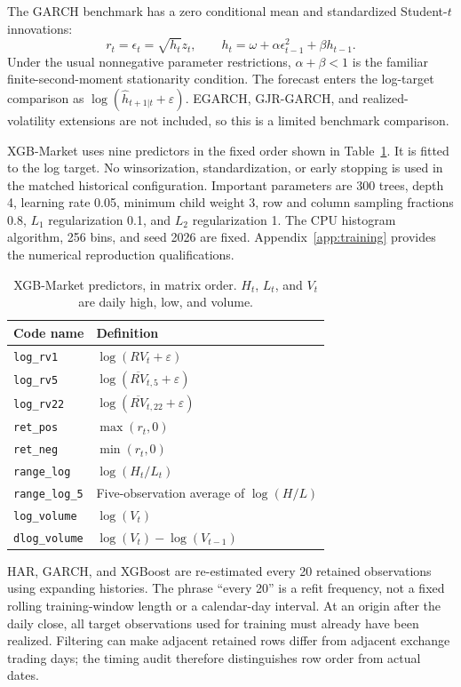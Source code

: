 The GARCH benchmark has a zero conditional mean and standardized Student-$t$ innovations:
\begin{equation}
r_t=\epsilon_t=\sqrt{h_t}z_t,\qquad
h_t=\omega+\alpha\epsilon_{t-1}^2+\beta h_{t-1}.
\end{equation}
Under the usual nonnegative parameter restrictions, $\alpha+\beta<1$ is the familiar finite-second-moment stationarity condition. The forecast enters the log-target comparison as $\log(\widehat h_{t+1|t}+\varepsilon)$. EGARCH, GJR-GARCH, and realized-volatility extensions are not included, so this is a limited benchmark comparison.

XGB-Market uses nine predictors in the fixed order shown in Table~\ref{tab:variables_main}. It is fitted to the log target. No winsorization, standardization, or early stopping is used in the matched historical configuration. Important parameters are 300 trees, depth 4, learning rate 0.05, minimum child weight 3, row and column sampling fractions 0.8, $L_1$ regularization 0.1, and $L_2$ regularization 1. The CPU histogram algorithm, 256 bins, and seed 2026 are fixed. Appendix~\ref{app:training} provides the numerical reproduction qualifications.

\begin{table}[htbp]\centering\small
\caption{XGB-Market predictors, in matrix order. $H_t$, $L_t$, and $V_t$ are daily high, low, and volume.}
\label{tab:variables_main}
\begin{tabularx}{\textwidth}{lX}\toprule Code name & Definition\\\midrule
\texttt{log\_rv1} & $\log(RV_t+\varepsilon)$\\
\texttt{log\_rv5} & $\log(\overline{RV}_{t,5}+\varepsilon)$\\
\texttt{log\_rv22} & $\log(\overline{RV}_{t,22}+\varepsilon)$\\
\texttt{ret\_pos} & $\max(r_t,0)$\\
\texttt{ret\_neg} & $\min(r_t,0)$\\
\texttt{range\_log} & $\log(H_t/L_t)$\\
\texttt{range\_log\_5} & Five-observation average of $\log(H/L)$\\
\texttt{log\_volume} & $\log(V_t)$\\
\texttt{dlog\_volume} & $\log(V_t)-\log(V_{t-1})$\\\bottomrule
\end{tabularx}
\end{table}

HAR, GARCH, and XGBoost are re-estimated every 20 retained observations using expanding histories. The phrase ``every 20'' is a refit frequency, not a fixed rolling training-window length or a calendar-day interval. At an origin after the daily close, all target observations used for training must already have been realized. Filtering can make adjacent retained rows differ from adjacent exchange trading days; the timing audit therefore distinguishes row order from actual dates.


